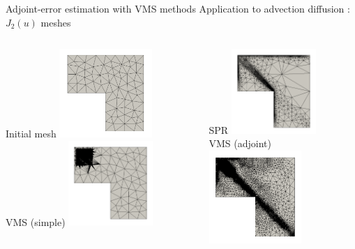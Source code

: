 \documentclass[fleqn]{beamer}
\begin{document}
\begin{frame}{Adjoint-error estimation with VMS methods}
{Application to advection diffusion : $J_2(u)$ meshes}

\begin{columns}
\begin{column}{3.2cm}
Initial mesh
\includegraphics[width=3.5cm]{../img/vms_lshape_global_initial.pdf} \\
VMS (simple)
\includegraphics[width=3.2cm]{../img/vms_lshape_square_vms1_final.pdf}
\end{column}

\begin{column}{4cm}
SPR 
\includegraphics[width=3.2cm]{../img/vms_lshape_global_spr_final.pdf}\\
VMS (adjoint)\\
\includegraphics[width=3.5cm]{../img/vms_lshape_square_vms2_final.pdf}
\end{column}
\end{columns}

\end{frame}
\end{document}
